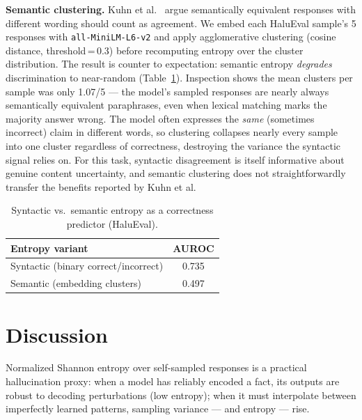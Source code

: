 \documentclass{llncs}
\begin{document}
\textbf{Semantic clustering.} Kuhn et al.~\cite{kuhn2023semantic} argue
semantically equivalent responses with different wording should count as
agreement. We embed each HaluEval sample's 5 responses with
\texttt{all-MiniLM-L6-v2} and apply agglomerative clustering (cosine
distance, threshold\,=\,0.3) before recomputing entropy over the cluster
distribution. The result is counter to expectation: semantic entropy
\emph{degrades} discrimination to near-random (Table~\ref{tab:semantic}).
Inspection shows the mean clusters per sample was only 1.07/5 — the model's
sampled responses are nearly always semantically equivalent paraphrases, even
when lexical matching marks the majority answer wrong. The model often
expresses the \emph{same} (sometimes incorrect) claim in different words, so
clustering collapses nearly every sample into one cluster regardless of
correctness, destroying the variance the syntactic signal relies on. For this
task, syntactic disagreement is itself informative about genuine content
uncertainty, and semantic clustering does not straightforwardly transfer the
benefits reported by Kuhn et al.

\begin{table}[h]
\centering
\caption{Syntactic vs.\ semantic entropy as a correctness predictor (HaluEval).}
\label{tab:semantic}
\begin{tabular}{lc}
\toprule
\textbf{Entropy variant} & \textbf{AUROC} \\
\midrule
Syntactic (binary correct/incorrect) & 0.735 \\
Semantic (embedding clusters)        & 0.497 \\
\bottomrule
\end{tabular}
\end{table}

\FloatBarrier

\section{Discussion}
\label{sec:discussion}

Normalized Shannon entropy over self-sampled responses is a practical
hallucination proxy: when a model has reliably encoded a fact, its outputs
are robust to decoding perturbations (low entropy); when it must interpolate
between imperfectly learned patterns, sampling variance — and entropy — rise.
\end{document}
